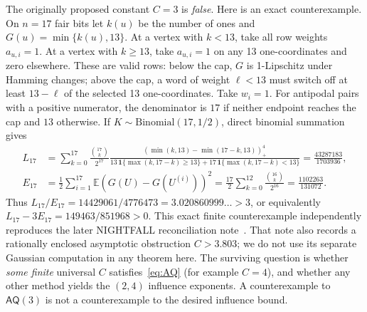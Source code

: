 \documentclass[11pt]{article}
\numberwithin{equation}{section}
\theoremstyle{remark}
\newcommand{\E}{\mathbb E}
\newcommand{\one}{\mathbf 1}
\newcommand{\pos}[1]{(#1)_{+}}
\begin{document}
The originally proposed constant $C=3$ is \emph{false}. Here is an exact counterexample. On $n=17$ fair bits let $k(u)$ be the number of ones and $G(u)=\min\{k(u),13\}$. At a vertex with $k<13$, take all row weights $a_{u,i}=1$. At a vertex with $k\ge13$, take $a_{u,i}=1$ on any 13 one-coordinates and zero elsewhere. These are valid rows: below the cap, $G$ is 1-Lipschitz under Hamming changes; above the cap, a word of weight $\ell<13$ must switch off at least $13-\ell$ of the selected 13 one-coordinates. Take $w_i=1$. For antipodal pairs with a positive numerator, the denominator is $17$ if neither endpoint reaches the cap and $13$ otherwise. If $K\sim\mathrm{Binomial}(17,1/2)$, direct binomial summation gives
\begin{equation}\label{eq:AQnumbers}
 \begin{split}
 L_{17}&=\sum_{k=0}^{17}\frac{\binom{17}{k}}{2^{17}}
 \frac{\pos{\min(k,13)-\min(17-k,13)}^4}
 {13\,\one\{\max(k,17-k)\ge13\}+17\,\one\{\max(k,17-k)<13\}}
 =\frac{43287183}{1703936},\\
 E_{17}&=\frac12\sum_{i=1}^{17}\E(G(U)-G(U^{(i)}))^2
 =\frac{17}{2}\sum_{k=0}^{12}\frac{\binom{16}{k}}{2^{16}}
 =\frac{1102263}{131072}.
 \end{split}
\end{equation}
Thus $L_{17}/E_{17}=14429061/4776473=3.020860999\ldots>3$, or equivalently $L_{17}-3E_{17}=149463/851968>0$. This exact finite counterexample independently reproduces the later NIGHTFALL reconciliation note~\cite{NFReconcile}. That note also records a rationally enclosed asymptotic obstruction $C>3.803$; we do not use its separate Gaussian computation in any theorem here. The surviving question is whether \emph{some finite} universal $C$ satisfies~\eqref{eq:AQ} (for example $C=4$), and whether any other method yields the $(2,4)$ influence exponents. A counterexample to $\mathsf{AQ}(3)$ is not a counterexample to the desired influence bound.
\end{document}
